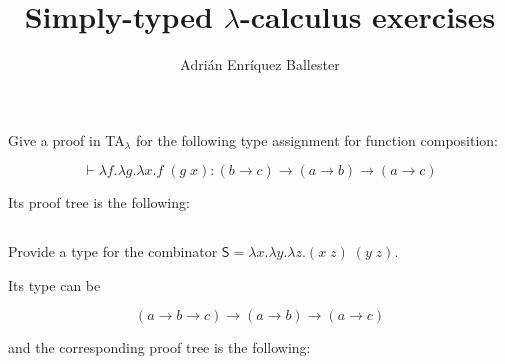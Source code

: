\documentclass{article}
\title{Simply-typed $\lambda$-calculus exercises}
\author{Adrián Enríquez Ballester}
\begin{document}
\maketitle

\subsection{}\label{ex:1}

Give a proof in TA$_\lambda$ for the following type assignment
for function composition:

$$
  \vdash \lambda f.\lambda g. \lambda x.f\;(g\;x) : 
    (b \rightarrow c) \rightarrow 
    (a \rightarrow b) \rightarrow
    (a \rightarrow c)
$$

Its proof tree is the following:

\begin{mathpar}
\end{mathpar}

\subsection{}\label{ex:2}

Provide a type for the combinator $\mathsf{S} = 
\lambda x. \lambda y. \lambda z. (x\;z)\;(y\;z)$.

Its type can be

$$
    (a \rightarrow b \rightarrow c) \rightarrow 
    (a \rightarrow b) \rightarrow
    (a \rightarrow c)
$$

and the corresponding proof tree is the following:
\end{document}
